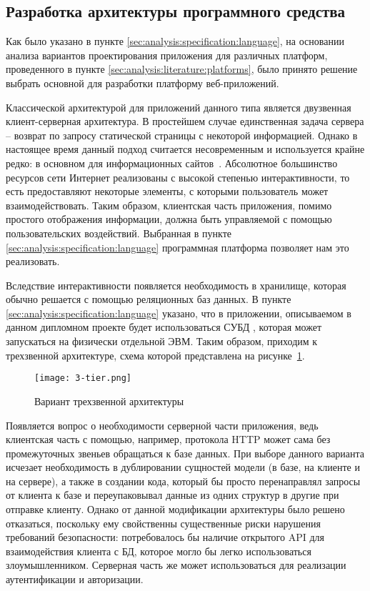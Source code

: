 \subsection{Разработка архитектуры программного средства}
\label{sec:design:architecture}

Как было указано в пункте \ref{sec:analysis:specification:language}, на основании анализа вариантов проектирования приложения для различных платформ, проведенного в пункте \ref{sec:analysis:literature:platforms}, было принято решение выбрать основной для разработки платформу веб-при\-ложений.

Классической архитектурой для приложений данного типа является двузвенная клиент-серверная архитектура. В простейшем случае единственная задача сервера -- возврат по запросу статической страницы с некоторой информацией. Однако в настоящее время данный подход считается несовременным и используется крайне редко: в основном для информационных сайтов~\cite{from_sites_to_webapps}. Абсолютное большинство ресурсов сети Интернет реализованы с высокой степенью интерактивности, то есть предоставляют некоторые элементы, с которыми пользователь может взаимодействовать. Таким образом, клиентская часть приложения, помимо простого отображения информации, должна быть управляемой с помощью пользовательских воздействий. Выбранная в пункте \ref{sec:analysis:specification:language} программная платформа позволяет нам это реализовать.

Вследствие интерактивности появляется необходимость в хранилище, которая обычно решается с помощью реляционных баз данных. В пункте \ref{sec:analysis:specification:language} указано, что в приложении, описываемом в данном дипломном проекте будет использоваться СУБД \nezaboodka, которая может запускаться на физически отдельной ЭВМ. Таким образом, приходим к трехзвенной архитектуре, схема которой представлена на рисунке~\ref{fig:analysis:specification:language:3-tier}.

\begin{figure}[ht]
\centering
	\texttt{[image: 3-tier.png]}
	\caption{Вариант трехзвенной архитектуры}
	\label{fig:analysis:specification:language:3-tier}
\end{figure}

Появляется вопрос о необходимости серверной части приложения, ведь клиентская часть с помощью, например, протокола HTTP может сама без промежуточных звеньев обращаться к базе данных. При выборе данного варианта исчезает необходимость в дублировании сущностей модели (в базе, на клиенте и на сервере), а также в создании кода, который бы просто перенаправлял запросы от клиента к базе и переупаковывал данные из одних структур в другие при отправке клиенту. Однако от данной модификации архитектуры было решено отказаться, поскольку ему свойственны существенные риски нарушения требований безопасности: потребовалось бы наличие открытого API для взаимодействия клиента с БД, которое могло бы легко использоваться злоумышленником. Серверная часть же может использоваться для реализации аутентификации и авторизации. 

